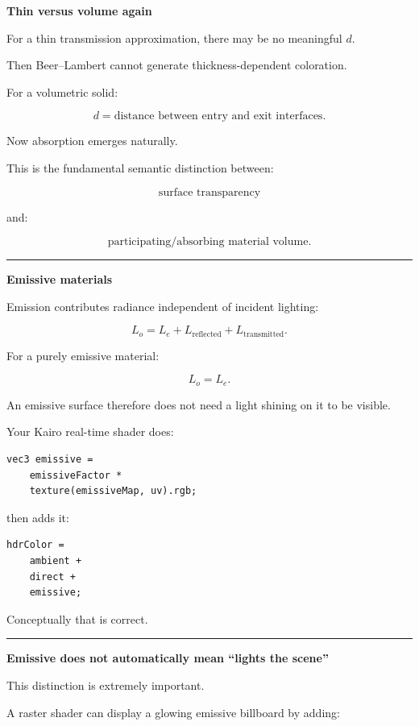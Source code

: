 \textbf{Thin versus volume again}

For a thin transmission approximation, there may be no meaningful \(d\).

Then Beer--Lambert cannot generate thickness-dependent coloration.

For a volumetric solid:

\[
d=
\text{distance between entry and exit interfaces}.
\]

Now absorption emerges naturally.

This is the fundamental semantic distinction between:

\[
\boxed{\text{surface transparency}}
\]

and:

\[
\boxed{\text{participating/absorbing material volume}}.
\]

\begin{center}\rule{0.5\linewidth}{0.5pt}\end{center}

\textbf{Emissive materials}

Emission contributes radiance independent of incident lighting:

\[
\boxed{
L_o=
L_e+
L_{\text{reflected}}
+
L_{\text{transmitted}}.
}
\]

For a purely emissive material:

\[
L_o=L_e.
\]

An emissive surface therefore does not need a light shining on it to be visible.

Your Kairo real-time shader does:

\begin{verbatim}
vec3 emissive =
    emissiveFactor *
    texture(emissiveMap, uv).rgb;
\end{verbatim}

then adds it:

\begin{verbatim}
hdrColor =
    ambient +
    direct +
    emissive;
\end{verbatim}

Conceptually that is correct.

\begin{center}\rule{0.5\linewidth}{0.5pt}\end{center}

\textbf{Emissive does not automatically mean ``lights the scene''}

This distinction is extremely important.

A raster shader can display a glowing emissive billboard by adding:

